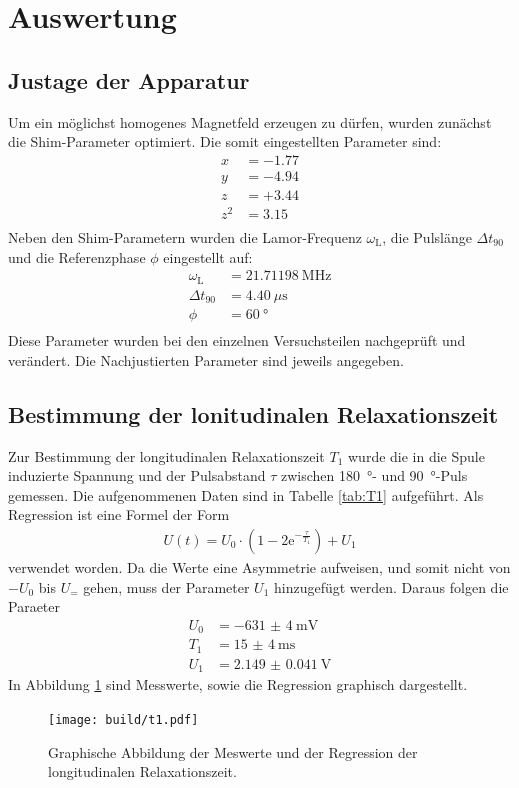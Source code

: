 \newpage
\section{Auswertung}
\label{sec:Auswertung}

\subsection{Justage der Apparatur}
Um ein möglichst homogenes Magnetfeld erzeugen zu dürfen, wurden zunächst die
Shim-Parameter optimiert. Die somit eingestellten Parameter sind:
\begin{align*}
  x &= -\num{1.77}  \\
  y &= -\num{4.94}  \\
  z &= +\num{3.44}  \\
  z^2 &= \num{3.15} \\
\end{align*}
Neben den Shim-Parametern wurden die Lamor-Frequenz $\omega_\text{L}$, die
Pulslänge $\Delta t_\text{90}$ und die Referenzphase $\phi$ eingestellt auf:
\begin{align*}
  \omega_\text{L} &= \SI{21.71198}{\mega\hertz} \\
  \Delta t_\text{90} &= \SI{4.40}{\mu\second} \\
  \phi &= \SI{60}{\degree} \\
\end{align*}
Diese Parameter wurden bei den einzelnen Versuchsteilen nachgeprüft und
verändert. Die Nachjustierten Parameter sind jeweils angegeben.

\subsection{Bestimmung der lonitudinalen Relaxationszeit}
Zur Bestimmung der longitudinalen Relaxationszeit $T_1$ wurde die in die
Spule induzierte Spannung und der Pulsabstand $\tau$ zwischen \SI{180}{\degree}-
und \SI{90}{\degree}-Puls gemessen. Die aufgenommenen Daten sind in Tabelle
\ref{tab:T1} aufgeführt. Als Regression ist eine Formel der Form
\begin{align*}
  U(t) = U_0 \cdot \left(1- 2\text{e}^{-\frac{\tau}{T_1}}\right) + U_1
\end{align*}
verwendet worden. Da die Werte eine Asymmetrie aufweisen, und somit nicht von
$-U_0$ bis $U_=$ gehen, muss der Parameter $U_1$ hinzugefügt werden. Daraus
folgen die Paraeter
\begin{align*}
  U_0 &= -\SI{631(4)}{\milli\volt} \\
  T_1 &= \SI{15(4)}{\milli\second} \\
  U_1 &= \SI{2.149(41)}{\volt}
\end{align*}
In Abbildung \ref{plt:T1} sind Messwerte, sowie die Regression graphisch dargestellt.
\begin{figure}[htb]
  \centering
  \texttt{[image: build/t1.pdf]}
  \caption{Graphische Abbildung der Meswerte und der Regression der longitudinalen Relaxationszeit.}
  \label{plt:T1}
\end{figure}


